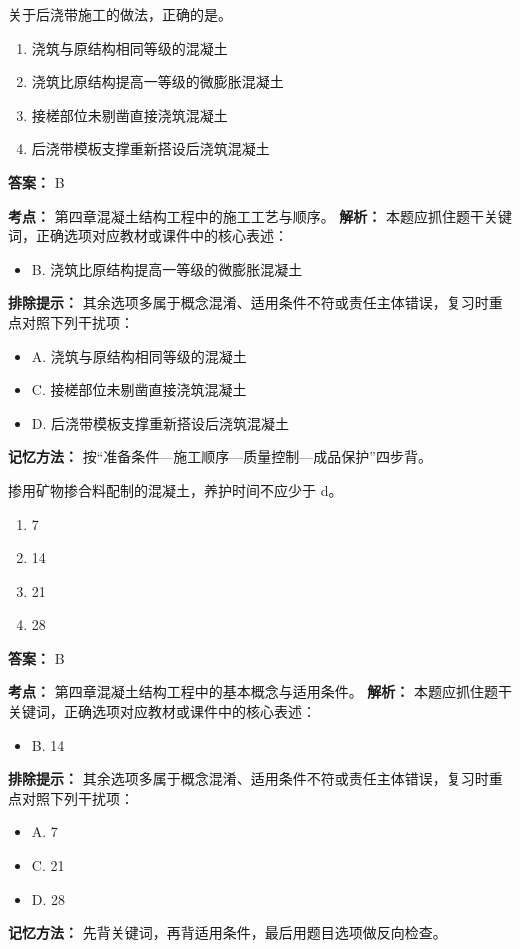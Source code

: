 \documentclass[UTF8,fontset=fandol,11pt]{ctexart}
\begin{document}
\begin{quizbox}[title={第 78 题}]
关于后浇带施工的做法，正确的是。\\
\begin{enumerate}[label=\Alph*.]
\item 浇筑与原结构相同等级的混凝土
\item 浇筑比原结构提高一等级的微膨胀混凝土
\item 接槎部位未剔凿直接浇筑混凝土
\item 后浇带模板支撑重新搭设后浇筑混凝土
\end{enumerate}
\textbf{答案：} B
\vspace{0.25em}
\begin{answerbox}[title={考点解析}]
\textbf{考点：} 第四章混凝土结构工程中的施工工艺与顺序。
\textbf{解析：} 本题应抓住题干关键词，正确选项对应教材或课件中的核心表述：
\begin{itemize}
\item B. 浇筑比原结构提高一等级的微膨胀混凝土
\end{itemize}
\textbf{排除提示：} 其余选项多属于概念混淆、适用条件不符或责任主体错误，复习时重点对照下列干扰项：
\begin{itemize}
\item A. 浇筑与原结构相同等级的混凝土
\item C. 接槎部位未剔凿直接浇筑混凝土
\item D. 后浇带模板支撑重新搭设后浇筑混凝土
\end{itemize}
\textbf{记忆方法：} 按“准备条件—施工顺序—质量控制—成品保护”四步背。
\end{answerbox}
\end{quizbox}

\begin{quizbox}[title={第 79 题}]
掺用矿物掺合料配制的混凝土，养护时间不应少于 d。\\
\begin{enumerate}[label=\Alph*.]
\item 7
\item 14
\item 21
\item 28
\end{enumerate}
\textbf{答案：} B
\vspace{0.25em}
\begin{answerbox}[title={考点解析}]
\textbf{考点：} 第四章混凝土结构工程中的基本概念与适用条件。
\textbf{解析：} 本题应抓住题干关键词，正确选项对应教材或课件中的核心表述：
\begin{itemize}
\item B. 14
\end{itemize}
\textbf{排除提示：} 其余选项多属于概念混淆、适用条件不符或责任主体错误，复习时重点对照下列干扰项：
\begin{itemize}
\item A. 7
\item C. 21
\item D. 28
\end{itemize}
\textbf{记忆方法：} 先背关键词，再背适用条件，最后用题目选项做反向检查。
\end{answerbox}
\end{quizbox}
\end{document}
